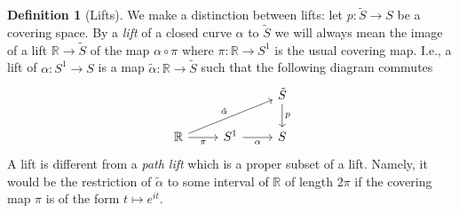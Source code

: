 \documentclass[reqno]{amsart}
\theoremstyle{definition}
\newtheorem{definition}[theorem]{Definition}
\theoremstyle{remark}
\begin{document}
\begin{definition}[Lifts]
    We make a distinction between lifts: let $p \colon
    \tilde{S} \to S$ be a covering space. By a \textit{lift} of a closed
    curve $\alpha$ to $\tilde{S}$ we will always mean the image of
    a lift $\mathbb{R} \to \tilde{S}$ of the map
    $\alpha \circ \pi$ where $\pi \colon \mathbb{R} \to S^{1}$ is
    the usual covering map. I.e., a lift of $\alpha \colon
    S^{1} \to S$ is a map  $\tilde{\alpha} \colon \mathbb{R} \to 
    \tilde{S}$ such that the following diagram commutes
    \begin{equation*}
    \begin{tikzcd}
        & & \tilde{S} \ar[d, "p"]\\
        \mathbb{R} \ar[r, "\pi"'] \ar[rru, "\tilde{\alpha}"] & S^{1} \ar[r, 
        "\alpha"'] & S
    \end{tikzcd}
    \end{equation*}
    A lift is different from a \textit{path lift} which is
    a proper subset of a lift. Namely, it would be
    the restriction of $\tilde{\alpha}$ to some interval of
    $\mathbb{R}$ of length $2 \pi$ if the covering map
    $\pi$ is of the form $t \mapsto e^{it}$.
\end{definition}
\end{document}
